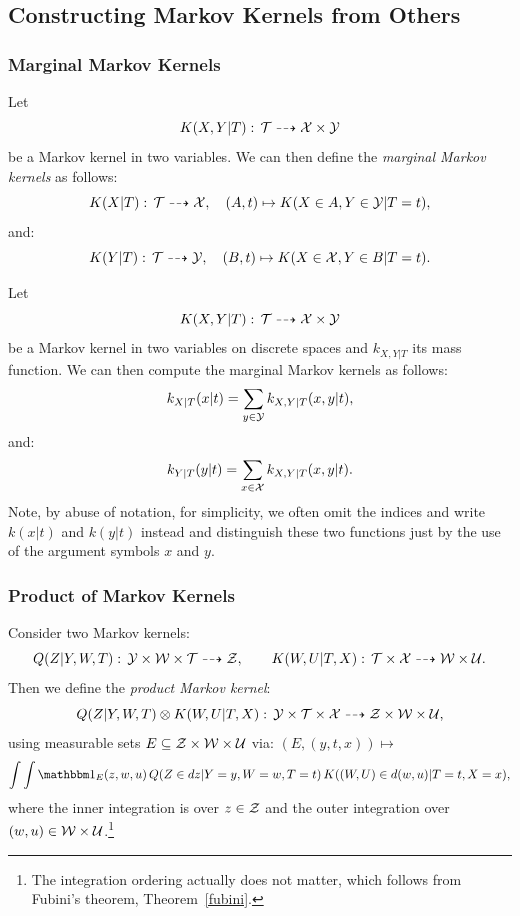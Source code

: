 \subsection{Constructing Markov Kernels from Others}


\subsubsection{Marginal Markov Kernels}

\begin{Def}
    \label{def-marginal-markov-kernels}
    Let 
    \[K(X,Y|T):\,\mathcal{T} \dashrightarrow  \mathcal{X} \times \mathcal{Y} \]
    be a Markov kernel in two variables.
    We can then define the \emph{marginal Markov kernels} as follows:
    \[ K(X|T):\, \mathcal{T} \dashrightarrow \mathcal{X},\quad (A,t) \mapsto K(X \in A, Y \in \mathcal{Y}|T=t),  \]
    and:
    \[ K(Y|T):\, \mathcal{T} \dashrightarrow \mathcal{Y},\quad (B,t) \mapsto K(X \in \mathcal{X}, Y \in B|T=t).  \]
\end{Def}

\begin{Eg}
    Let 
    \[K(X,Y|T):\,\mathcal{T} \dashrightarrow  \mathcal{X} \times \mathcal{Y} \]
    be a Markov kernel in two variables on discrete spaces and $k_{X,Y|T}$ its mass function.
    We can then compute the marginal Markov kernels as follows:
    \[  k_{X|T}(x|t) = \sum_{y \in \mathcal{Y}} k_{X,Y|T}(x,y|t), \]
    and:
    \[  k_{Y|T}(y|t) = \sum_{x \in \mathcal{X}} k_{X,Y|T}(x,y|t). \]
    Note, by abuse of notation, for simplicity, we often omit the indices and write $k(x|t)$ and $k(y|t)$ instead 
    and distinguish these two functions just by the use of the argument symbols $x$ and $y$.
\end{Eg}


\subsubsection{Product of Markov Kernels}

\begin{Def}
    \label{def-product-markov-kernels}
    Consider two Markov kernels:
    \[ Q(Z|Y,W,T):\, \mathcal{Y} \times \mathcal{W}\times \mathcal{T} \dashrightarrow \mathcal{Z},\qquad  
    K(W,U|T,X):\, \mathcal{T} \times \mathcal{X} \dashrightarrow \mathcal{W} \times \mathcal{U}. \]
    Then we define the \emph{product Markov kernel}:
    \[ Q(Z|Y,W,T) \otimes K(W,U|T,X) :\, \mathcal{Y} \times  \mathcal{T} \times \mathcal{X} \dashrightarrow \mathcal{Z} \times \mathcal{W} \times \mathcal{U}, \]
    using  measurable sets $E \subseteq \mathcal{Z} \times \mathcal{W} \times \mathcal{U}$ via: $(E,(y,t,x)) \mapsto $
    \[\int\int \I_E(z,w,u)\, Q(Z \in dz|Y=y,W=w,T=t) \, K((W,U) \in d(w,u)|T=t,X=x),\]
  where the inner integration is over $z \in \mathcal{Z}$ and the outer integration over $(w,u) \in \mathcal{W}\times \mathcal{U}$.\footnote{The integration ordering actually does not matter, which follows from Fubini's theorem, Theorem~\ref{fubini}.}
\end{Def}

